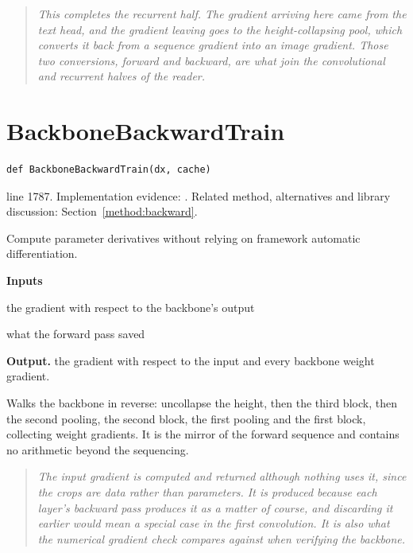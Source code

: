 \begin{quote}\small\itshape This completes the recurrent half. The gradient arriving here came from the text head, and the gradient leaving goes to the height-collapsing pool, which converts it back from a sequence gradient into an image gradient. Those two conversions, forward and backward, are what join the convolutional and recurrent halves of the reader.\end{quote}


\section{BackboneBackwardTrain}\label{fn:train:BackboneBackwardTrain}
\begin{lstlisting}[style=sig]
def BackboneBackwardTrain(dx, cache)
\end{lstlisting}
 line 1787. Implementation evidence: \cite{code2026}. Related method, alternatives and library discussion: Section~\ref{method:backward}.


Compute parameter derivatives without relying on framework automatic differentiation.




\noindent\textbf{Inputs}
\begin{description}[leftmargin=2.2em,style=nextline,font=\normalfont\ttfamily]\setlength\itemsep{1pt}
  \item[{dx}] \normalfont the gradient with respect to the backbone's output
  \item[{cache}] \normalfont what the forward pass saved
\end{description}

\noindent\textbf{Output.} the gradient with respect to the input and every backbone weight gradient.


Walks the backbone in reverse: uncollapse the height, then the third block, then the second pooling, the second block, the first pooling and the first block, collecting weight gradients. It is the mirror of the forward sequence and contains no arithmetic beyond the sequencing.


\begin{quote}\small\itshape The input gradient is computed and returned although nothing uses it, since the crops are data rather than parameters. It is produced because each layer's backward pass produces it as a matter of course, and discarding it earlier would mean a special case in the first convolution. It is also what the numerical gradient check compares against when verifying the backbone.\end{quote}


